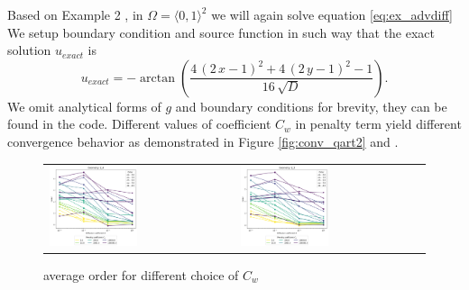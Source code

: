 \begin{example}
\label{ex:quart2}
Based on Example 2 \cite{Antonietti2013},
in $\Omega = \langle 0, 1 \rangle^2$ we will again solve equation \eqref{eq:ex_advdiff}
We setup boundary condition and source function in such way that the exact 
solution $u_{exact}$ is
\begin{equation}
	u_{exact} =  -\arctan\left(\frac{4 \, {\left(2 \, x - 1\right)}^{2} + 4 \, {\left(2 
	\, y - 1\right)}^{2} - 
	1}{16 \, \sqrt{\mathit{D}}}\right).
\end{equation}
We omit analytical forms of $g$ and boundary conditions for brevity, they can be found in 
the code.
Different values of coefficient $C_w$ in penalty term yield different 
convergence behavior as demonstrated in Figure \ref{fig:conv_qart2} and 
.
\end{example}

\begin{figure}[h!]
\centering
\begin{tabular}{p{} p{}}
	\vspace{0pt} 
	\includegraphics[width=0.49\textwidth]{../figs/parametric/advdiff_2D/ord_quarteroni2_2_4}
	&
	\vspace{0pt} 
	\includegraphics[width=0.49\textwidth]{../figs/parametric/advdiff_2D/ord_quarteroni2_2_3}
\end{tabular}
\caption{ average order for different choice of $C_w$}
\label{fig:orders_quarteroni2}
\end{figure}


